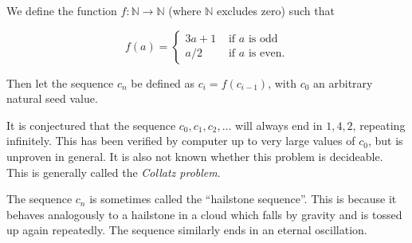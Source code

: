 \documentclass[12pt]{article}
\begin{document}
We define the function $f : \mathbb{N} \longrightarrow \mathbb{N} $ (where $\mathbb{N}$ excludes zero) such that

$$ f(a) =  \left\{
\begin{array}{rl}
3a+1  & \text{ if } a \text{ is odd }   \\
 a/2  & \text{ if } a \text{ is even.}  
\end{array}
\right. $$

Then let the sequence $c_n$ be defined as $c_i = f(c_{i-1})$, with $c_0$ an arbitrary natural seed value.

It is conjectured that the sequence $c_0, c_1, c_2, \ldots$ will always end in  $1,4,2$, repeating infinitely.  This has been verified by computer up to very large values of $c_0$, but is unproven in general. It is also not known whether this problem is decideable.  This is generally called the \emph{Collatz problem}.

The sequence $c_n$ is sometimes called the ``hailstone sequence''.  This is because it behaves analogously to a hailstone in a cloud which falls by gravity and is tossed up again repeatedly.  The sequence similarly ends in an eternal oscillation.
\end{document}
